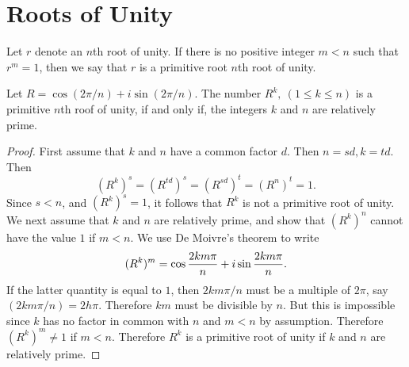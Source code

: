 \section{Roots of Unity}

Let $r$ denote an $n$th root of unity. If there is no positive integer $m < n$ such that $r^m = 1$, then we say that $r$ is a primitive root $n$th root of unity.

\begin{theorem}
Let $R = \cos(2\pi/n) + i \sin(2\pi/n)$. The number $R^k ,~(1 \le k \le n)$ is a primitive $n$th roof of unity, if and only if, the integers $k$ and $n$ are relatively prime. 
\end{theorem}

\begin{proof}
First assume that $k$ and $n$ have a common factor $d$. Then $n = sd,  k = td$. Then 
\[ (R^k)^s = (R^{td})^s = (R^{sd})^t = (R^n)^t = 1.\]
Since $s< n$, and $(R^k)^s = 1$, it follows that $R^k$ is not a primitive root of unity. \\

We next assume that $k$ and $n$ are relatively prime, and show that $(R^k)^n$ cannot have the value $1$ if $m < n$. We use De Moivre's theorem to write
\[ (R^k)^m = \cos{2km\pi\over n} + i \sin{2km\pi\over n}.\]
If the latter quantity is equal to $1$, then $2km\pi/n$ must be a multiple of $2\pi$,  say $(2 km\pi/n) = 2h\pi$. Therefore $km$ must be divisible by $n$. But this is impossible since $k$ has no
factor in common with $n$ and $m < n$ by assumption. Therefore $(R^k)^m \not= 1$ if $m < n$. Therefore $R^k$ is a primitive root of unity if $k$ and $n$ are relatively prime. 
\end{proof}